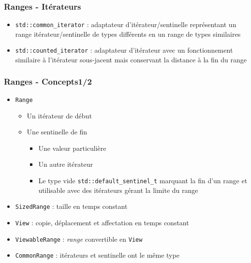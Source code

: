 \documentclass[C++.tex]{subfiles}
\begin{document}
\begin{frame}[fragile]
	\frametitle{Ranges - Itérateurs}
	\begin{itemize}
		\item \lstinline|std::common_iterator| : adaptateur d'itérateur/sentinelle représentant un range itérateur/sentinelle de types différents en un range de types similaires


		\item \lstinline|std::counted_iterator| : adaptateur d'itérateur avec un fonctionnement similaire à l'itérateur sous-jacent mais conservant la distance à la fin du range
	\end{itemize}
\end{frame}

\begin{frame}[fragile]
	\frametitle{Ranges - Concepts\titlehfill{}1/2}
	\begin{itemize}
		\item \lstinline|Range|
		\begin{itemize}
			\item Un itérateur de début
			\item Une sentinelle de fin
			\begin{itemize}
				\item Une valeur particulière
				\item Un autre itérateur


				\item Le type vide \lstinline|std::default_sentinel_t| marquant la fin d'un range et utilisable avec des itérateurs gérant la limite du range

			\end{itemize}
		\end{itemize}

		\item \lstinline|SizedRange| : taille en temps constant
		\item \lstinline|View| : copie, déplacement et affectation en temps constant
		\item \lstinline|ViewableRange| : \textit{range} convertible en \lstinline|View|
		\item \lstinline|CommonRange| : itérateurs et sentinelle ont le même type
	\end{itemize}
\end{frame}
\end{document}
